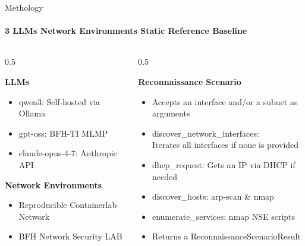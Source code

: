 \begin{frame}{Methology}
    \framesubtitle{\small 3 LLMs \quad\textbullet{} Network Environments \quad\textbullet\quad Static Reference Baseline}

    \centering
    \begin{columns}
        \begin{column}{0.5\textwidth}
             {
                \textbf{LLMs}
                \begin{itemize}
                    \item qwen3: Self-hosted via Ollama \\
                    \item gpt-oss: BFH-TI MLMP \\
                    \item claude-opus-4-7: Anthropic API \\
                \end{itemize}
            }

            \vspace{0.6em}
             {
                \textbf{Network Environments}
                \begin{itemize}
                    \item Reproducible Containerlab Network
                    \item BFH Network Security LAB
                \end{itemize}
            }
        \end{column}

        \begin{column}{0.5\textwidth}
             {
                \textbf{Reconnaissance Scenario}
                \begin{itemize}
                    \item Accepts an interface and/or a subnet as arguments
                    \item discover\_network\_interfaces: \\
                    Iterates all interfaces if none is provided
                    \item dhcp\_request: Gets an IP via DHCP if needed
                    \item discover\_hosts: arp-scan \& nmap
                    \item enumerate\_services: nmap NSE scripts
                    \item Returns a ReconnaissanceScenarioResult
                \end{itemize}
            }
        \end{column}
    \end{columns}
\end{frame}

